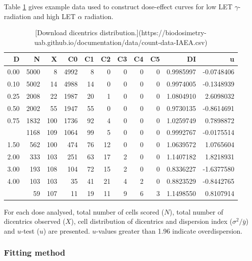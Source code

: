 \documentclass[]{scrartcl}
\begin{document}
Table \ref{tab:count-data} gives example data used to construct dose-effect curves for low LET \(\gamma\)-radiation and high LET \(\alpha\) radiation.

\begin{table}

\caption{\label{tab:count-data}[Download dicentrics distribution.](https://biodosimetry-uab.github.io/documentation/data/count-data-IAEA.csv)}
\centering
\begin{tabular}[t]{rrrrrrrrrrr}
\toprule
D & N & X & C0 & C1 & C2 & C3 & C4 & C5 & DI & u\\
\midrule
0.00 & 5000 & 8 & 4992 & 8 & 0 & 0 & 0 & 0 & 0.9985997 & -0.0748406\\
0.10 & 5002 & 14 & 4988 & 14 & 0 & 0 & 0 & 0 & 0.9974005 & -0.1348939\\
0.25 & 2008 & 22 & 1987 & 20 & 1 & 0 & 0 & 0 & 1.0804910 & 2.6098032\\
0.50 & 2002 & 55 & 1947 & 55 & 0 & 0 & 0 & 0 & 0.9730135 & -0.8614691\\
0.75 & 1832 & 100 & 1736 & 92 & 4 & 0 & 0 & 0 & 1.0259749 & 0.7898872\\
\addlinespace
1.00 & 1168 & 109 & 1064 & 99 & 5 & 0 & 0 & 0 & 0.9992767 & -0.0175514\\
1.50 & 562 & 100 & 474 & 76 & 12 & 0 & 0 & 0 & 1.0639572 & 1.0765604\\
2.00 & 333 & 103 & 251 & 63 & 17 & 2 & 0 & 0 & 1.1407182 & 1.8218931\\
3.00 & 193 & 108 & 104 & 72 & 15 & 2 & 0 & 0 & 0.8336227 & -1.6377580\\
4.00 & 103 & 103 & 35 & 41 & 21 & 4 & 2 & 0 & 0.8823529 & -0.8442765\\
\addlinespace
5.00 & 59 & 107 & 11 & 19 & 11 & 9 & 6 & 3 & 1.1498550 & 0.8107914\\
\bottomrule
\end{tabular}
\end{table}

For each dose analysed, total number of cells scored (\(N\)), total number of dicentrics observed (\(X\)), cell distribution of dicentrics and dispersion index (\(\sigma^{2}/\bar{y}\)) and \(u\)-test (\(u\)) are presented. \(u\)-values greater than 1.96 indicate overdispersion.

\hypertarget{fitting-method}{%
\subsubsection{Fitting method}\label{fitting-method}}
\end{document}
